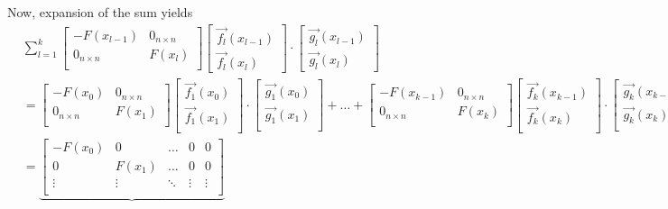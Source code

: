 \documentclass[10pt,reqno,oneside,a4paper]{article}
\begin{document}
Now, expansion of the sum yields
\begin{align}
&\sum_{l=1}^{k} 
\begin{bmatrix}
- F(x_{l-1}) & 0_{n\times n} \\
0_{n\times n} &  F(x_{l}) \\
\end{bmatrix}
\begin{bmatrix}
\vec{f_l}(x_{l-1})  \\
\vec{f_l}(x_{l}) 
\end{bmatrix}
\cdot
\begin{bmatrix}
\vec{g_l}(x_{l-1})  \\
\vec{g_l}(x_{l}) 
\end{bmatrix} \nonumber \\
&= 
\begin{bmatrix}
- F(x_{0}) & 0_{n\times n} \\
0_{n\times n} &  F(x_{1}) \\
\end{bmatrix}
\begin{bmatrix}
\vec{f_1}(x_0)  \\
\vec{f_1}(x_1)  \\
\end{bmatrix}
\cdot
\begin{bmatrix}
\vec{g_1}(x_0)  \\
\vec{g_1}(x_1)  \\
\end{bmatrix}
+ \ldots + 
\begin{bmatrix}
- F(x_{k-1}) & 0_{n\times n} \\
0_{n\times n} &  F(x_{k}) \\
\end{bmatrix}
\begin{bmatrix}
\vec{f_k}(x_{k-1})  \\
\vec{f_k}(x_k)  \\
\end{bmatrix}
\cdot
\begin{bmatrix}
\vec{g_k}(x_{k-1})  \\
\vec{g_k}(x_k)  \\
\end{bmatrix}  \nonumber \\
&= \underbrace{
\begin{bmatrix}
- F(x_{0}) & 0 & \ldots & 0 & 0 \\
0 & F(x_{1}) & \ldots & 0 & 0 \\
\vdots & \vdots & \ddots & \vdots & \vdots \\

\end{bmatrix}}
\end{align}
\end{document}
